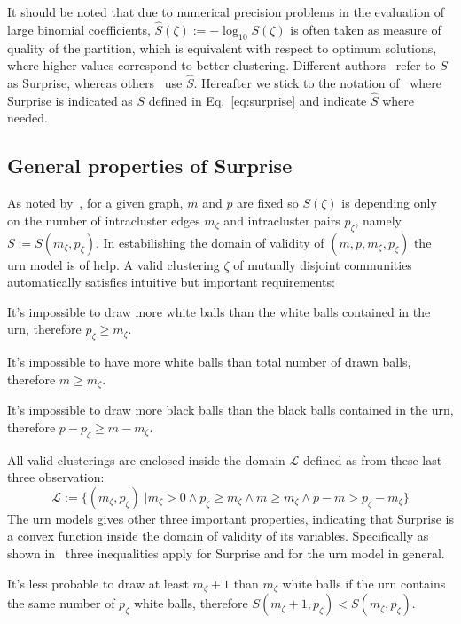 It should be noted that due to numerical precision problems in the evaluation of large binomial coefficients, $\hat{S}(\zeta) := -\log_{10}S(\zeta)$ is often taken as measure of quality of the partition, which is equivalent with respect to optimum solutions, where higher values correspond to better clustering.
Different authors~\cite{arnauVMarsS2005,fleck2014} refer to $S$ as Surprise, whereas others~\cite{aldecoa2011,aldecoa2013} use $\hat{S}$. Hereafter we stick to the notation of~\cite{fleck2014} where Surprise is indicated as $S$ defined in Eq.~\ref{eq:surprise} and indicate $\hat{S}$ where needed.

\subsection{General properties of Surprise}
As noted by~\cite{fleck2014}, for a given graph, $m$ and $p$ are fixed so $S(\zeta)$ is depending only on the number of intracluster edges $m_\zeta$ and intracluster pairs $p_\zeta$, namely $S:=S(m_\zeta,p_\zeta)$.
In estabilishing the domain of validity of $(m,p,m_\zeta,p_\zeta)$ the urn model is of help. A valid clustering $\zeta$ of mutually disjoint communities automatically satisfies intuitive but important requirements:
\begin{obs}
It's impossible to draw more white balls than the white balls contained in the urn, therefore $p_\zeta \geq m_\zeta$.
\end{obs}
\begin{obs}
It's impossible to have more white balls than total number of drawn balls, therefore $m\geq m_\zeta$.
\end{obs}
\begin{obs}
It's impossible to draw more black balls than the black balls contained in the urn, therefore $p-p_\zeta \geq m-m_\zeta$.
\end{obs}
All valid clusterings are enclosed inside the domain $\mathcal{L}$ defined as from these last three observation:
\begin{equation}
\mathcal{L} := \{ ( m_\zeta,p_\zeta) \; | m_\zeta > 0 \land p_\zeta \geq m_\zeta \land m \geq m_\zeta \land p-m > p_\zeta - m_\zeta \}
\end{equation}
The urn models gives other three important properties, indicating that Surprise is a convex function inside the domain of validity of its variables. Specifically as shown in~\cite{fleck2014} three inequalities apply for Surprise and for the urn model in general.
\begin{props}\label{prop:prop1}
\label{list:surprise_properties} It's less probable to draw at least $m_\zeta+1$ than $m_\zeta$ white balls if the urn contains the same number of $p_\zeta$ white balls, therefore $S(m_\zeta+1,p_\zeta) < S(m_\zeta,p_\zeta)$.
\end{props}
